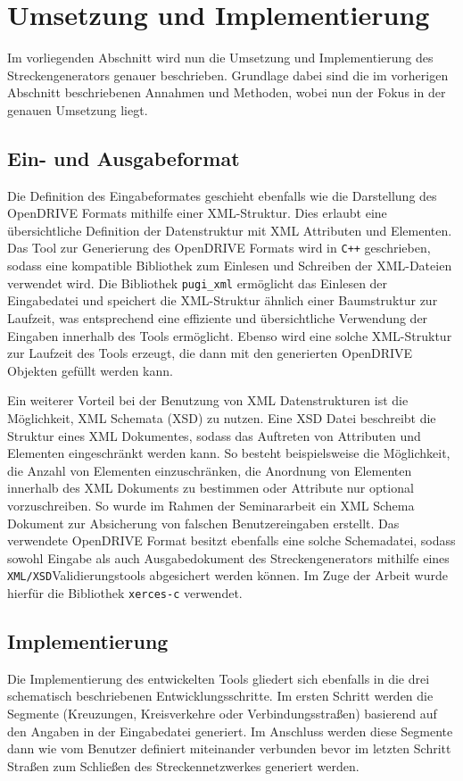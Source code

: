 \chapter{Umsetzung und Implementierung}
Im vorliegenden Abschnitt wird nun die Umsetzung und Implementierung des Streckengenerators genauer beschrieben. Grundlage dabei sind die im vorherigen Abschnitt beschriebenen Annahmen und Methoden, wobei nun der Fokus in der genauen Umsetzung liegt.

\section{Ein- und Ausgabeformat}
Die Definition des Eingabeformates geschieht ebenfalls wie die Darstellung des OpenDRIVE Formats mithilfe einer XML-Struktur. Dies erlaubt eine übersichtliche Definition der Datenstruktur mit XML Attributen und Elementen. Das Tool zur Generierung des OpenDRIVE Formats wird in \texttt{C++} geschrieben, sodass eine kompatible Bibliothek zum Einlesen und Schreiben der XML-Dateien verwendet wird. Die Bibliothek \texttt{pugi\_xml}\cite{pugixml.2019} ermöglicht das Einlesen der Eingabedatei und speichert die XML-Struktur ähnlich einer Baumstruktur zur Laufzeit, was entsprechend eine effiziente und übersichtliche Verwendung der Eingaben innerhalb des Tools ermöglicht. Ebenso wird eine solche XML-Struktur zur Laufzeit des Tools erzeugt, die dann mit den generierten OpenDRIVE Objekten gefüllt werden kann.

Ein weiterer Vorteil bei der Benutzung von XML Datenstrukturen ist die Möglichkeit, XML Schemata (XSD) zu nutzen. Eine XSD Datei beschreibt die Struktur eines XML Dokumentes, sodass das Auftreten von Attributen und Elementen eingeschränkt werden kann. So besteht beispielsweise die Möglichkeit, die Anzahl von Elementen einzuschränken, die Anordnung von Elementen innerhalb des XML Dokuments zu bestimmen oder Attribute nur optional vorzuschreiben. So wurde im Rahmen der Seminararbeit ein XML Schema Dokument zur Absicherung von falschen Benutzereingaben erstellt. Das verwendete OpenDRIVE Format besitzt ebenfalls eine solche Schemadatei, sodass sowohl Eingabe als auch Ausgabedokument des Streckengenerators mithilfe eines \texttt{XML/XSD}Validierungstools abgesichert werden können. Im Zuge der Arbeit wurde hierfür die Bibliothek \texttt{xerces-c}\cite{Xerces.2019} verwendet.

\section{Implementierung}
Die Implementierung des entwickelten Tools gliedert sich ebenfalls in die drei schematisch beschriebenen Entwicklungsschritte. Im ersten Schritt werden die Segmente (Kreuzungen, Kreisverkehre oder Verbindungsstraßen) basierend auf den Angaben in der Eingabedatei generiert. Im Anschluss werden diese Segmente dann wie vom Benutzer definiert miteinander verbunden bevor im letzten Schritt Straßen zum Schließen des Streckennetzwerkes generiert werden.

